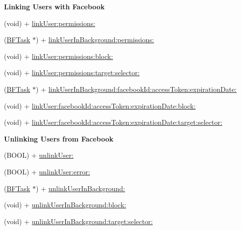\begin{Indent}{\bf Linking Users with Facebook}\par
{\em 

 

 }\begin{DoxyCompactItemize}
\item 
(void) + \hyperlink{interface_p_f_facebook_utils_af6ad4b0eaccdeedc9742c7f5c7fa668b}{link\+User\+:permissions\+:}
\item 
(\hyperlink{interface_b_f_task}{B\+F\+Task} $\ast$) + \hyperlink{interface_p_f_facebook_utils_ad354c92138180a52677dc43d12c8ed82}{link\+User\+In\+Background\+:permissions\+:}
\item 
(void) + \hyperlink{interface_p_f_facebook_utils_ab4879808763f3518fcdc6c55cbf09e83}{link\+User\+:permissions\+:block\+:}
\item 
(void) + \hyperlink{interface_p_f_facebook_utils_a90c6b7b9a1a6a505d8f2a9511a177a7b}{link\+User\+:permissions\+:target\+:selector\+:}
\item 
(\hyperlink{interface_b_f_task}{B\+F\+Task} $\ast$) + \hyperlink{interface_p_f_facebook_utils_a03112e2ce2837a4890fd8f070bd46e83}{link\+User\+In\+Background\+:facebook\+Id\+:access\+Token\+:expiration\+Date\+:}
\item 
(void) + \hyperlink{interface_p_f_facebook_utils_a54e7b9fdefbd2869d411ceed2b30e936}{link\+User\+:facebook\+Id\+:access\+Token\+:expiration\+Date\+:block\+:}
\item 
(void) + \hyperlink{interface_p_f_facebook_utils_a6a94d851720ad5def7db93ae84d2e12f}{link\+User\+:facebook\+Id\+:access\+Token\+:expiration\+Date\+:target\+:selector\+:}
\end{DoxyCompactItemize}
\end{Indent}
\begin{Indent}{\bf Unlinking Users from Facebook}\par
{\em 

 

 }\begin{DoxyCompactItemize}
\item 
(B\+O\+O\+L) + \hyperlink{interface_p_f_facebook_utils_a6726a3ef8cb945db59d60e410b6c562d}{unlink\+User\+:}
\item 
(B\+O\+O\+L) + \hyperlink{interface_p_f_facebook_utils_a1ecc255c277054f6a5dcf34a53fbace8}{unlink\+User\+:error\+:}
\item 
(\hyperlink{interface_b_f_task}{B\+F\+Task} $\ast$) + \hyperlink{interface_p_f_facebook_utils_a0fa5b2f0bae045b05cefd4636935a61f}{unlink\+User\+In\+Background\+:}
\item 
(void) + \hyperlink{interface_p_f_facebook_utils_aca714aba621d4257861deab47d1dabc9}{unlink\+User\+In\+Background\+:block\+:}
\item 
(void) + \hyperlink{interface_p_f_facebook_utils_ae2e3de3d5b10c5695e938e96408aba91}{unlink\+User\+In\+Background\+:target\+:selector\+:}
\end{DoxyCompactItemize}
\end{Indent}
